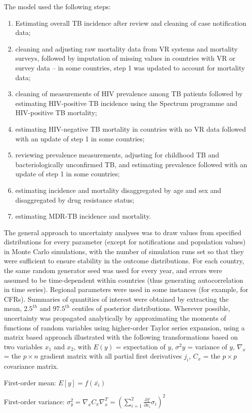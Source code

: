 The model used  the following steps: 

\begin{enumerate}
\item Estimating overall TB incidence after review and cleaning of case notification data;
\item cleaning and adjusting raw mortality data from VR systems and mortality surveys, followed by imputation of missing values in countries with VR or survey data – in some countries, step 1 was updated to account for mortality data;
\item cleaning of measurements of HIV prevalence among TB patients followed by estimating HIV-positive TB incidence using the Spectrum programme and HIV-positive TB mortality;
\item estimating HIV-negative TB mortality in countries with no VR data followed with an update of step 1 in some countries; 
\item reviewing prevalence measurements, adjusting for childhood TB and bacteriologically unconfirmed TB,  and estimating prevalence followed with an update of step 1 in some countries; 
\item estimating incidence and mortality disaggregated by age and sex and disaggregated by drug resistance status;
\item estimating MDR-TB incidence and mortality.
\end{enumerate}

The general approach to uncertainty analyses was to draw values from specified distributions for every parameter (except for notifications and population values) in Monte Carlo simulations, with the number of simulation runs set so that they were sufficient to ensure stability in the outcome distributions. For each country, the same random generator seed was used for every year, and errors were assumed to be time-dependent within countries (thus generating autocorrelation in time series). Regional parameters were used in some instances (for example, for CFRs). Summaries of quantities of interest were obtained by extracting the mean, $2.5^{th}$ and $97.5^{th}$ centiles of posterior distributions. Wherever possible, uncertainty was propagated analytically by approximating the moments of functions of random variables using higher-order Taylor series expansion\cite{Ku_1966}, using a matrix based approach\cite{Lab1998-dy} illustrated with the following transformations based on two variables $x_1$ and $x_2$, with $E(y)$ = expectation of $y$, $\sigma^2 y$ = variance of $y$, $\nabla_x$ = the $p \times n$ gradient matrix with all partial first derivatives $j_i$, $C_x$ = the $p \times p$ covariance matrix.

First-order mean: $E[y] = f(\bar{x_i})$

First-order variance: $\sigma^2_y=\nabla_x C_x \nabla^T_x=\left(\sum_{i=1}^{2}\frac{\partial{f}}{\partial{x_i}}\sigma_i\right)^2$


